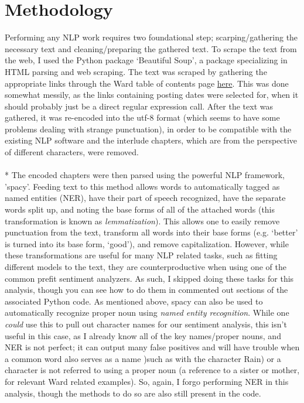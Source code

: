 \documentclass[11pt]{article}
\begin{document}
\section{Methodology}
\noindent
Performing any NLP work requires two foundational step; scarping/gathering the necessary text and cleaning/preparing the gathered text. To scrape the text from the web, I used the Python package `Beautiful Soup', a package specializing in HTML parsing and web scraping. The text was scraped by gathering the appropriate links through the Ward table of contents page \href{https://www.parahumans.net/table-of-contents/}{here}. This was done somewhat messily, as the links containing posting dates were selected for, when it should probably just be a direct regular expression call. After the text was gathered, it was re-encoded into the utf-8 format (which seems to have some problems dealing with strange punctuation), in order to be compatible with the existing NLP software and the interlude chapters, which are from the perspective of different characters, were removed.  
\\
\\*
The encoded chapters were then parsed using the powerful NLP framework, 'spacy'. Feeding text to this method allows words to automatically tagged as named entities (NER), have their part of speech recognized, have the separate words split up, and noting the base forms of all of the attached words (this transformation is known as \emph{lemmatization}). This allows one to easily remove punctuation from the text, transform all words into their base forms (e.g. `better' is turned into its base form, `good'), and remove capitalization. However, while these transformations are useful for many NLP related tasks, such as fitting different models to the text, they are counterproductive when using one of the common prefit sentiment analyzers. As such, I skipped doing these tasks for this analysis, though you can see how to do them in commented out sections of the associated Python code. As mentioned above, spacy can also be used to automatically recognize proper noun using \emph{named entity recognition}. While one \emph{could} use this to pull out character names for our sentiment analysis, this isn't useful in this case, as I already know all of the key names/proper nouns, and NER is not perfect; it can output many false positives and will have trouble when a common word also serves as a name )such as with the character Rain) or a character is not referred to using a proper noun (a reference to a sister or mother, for relevant Ward related examples). So, again, I forgo performing NER in this analysis, though the methods to do so are also still present in the code. 
\end{document}
